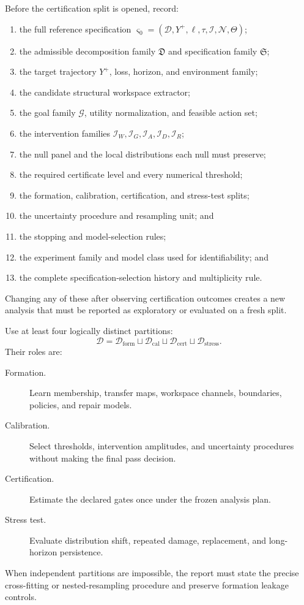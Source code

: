 Before the certification split is opened, record:
\begin{enumerate}
\item the full reference specification
 \(\varsigma_0=(\mathcal D,Y^+,\ell,\tau,\mathcal I,\mathcal N,\Theta)\);
\item the admissible decomposition family \(\mathfrak D\) and specification
 family \(\mathfrak S\);
\item the target trajectory \(Y^+\), loss, horizon, and environment family;
\item the candidate structural workspace extractor;
\item the goal family \(\mathcal G\), utility normalization, and feasible
 action set;
\item the intervention families \(\mathcal I_W,\mathcal I_G,\mathcal I_A,
 \mathcal I_D,\mathcal I_R\);
\item the null panel and the local distributions each null must preserve;
\item the required certificate level and every numerical threshold;
\item the formation, calibration, certification, and stress-test splits;
\item the uncertainty procedure and resampling unit; and
\item the stopping and model-selection rules;
\item the experiment family and model class used for identifiability; and
\item the complete specification-selection history and multiplicity rule.
\end{enumerate}
Changing any of these after observing certification outcomes creates a new
analysis that must be reported as exploratory or evaluated on a fresh split.


Use at least four logically distinct partitions:
\[
\boxed{
\mathcal D
=
\mathcal D_{\mathrm{form}}
\sqcup
\mathcal D_{\mathrm{cal}}
\sqcup
\mathcal D_{\mathrm{cert}}
\sqcup
\mathcal D_{\mathrm{stress}}.
}
\]
Their roles are:
\begin{description}
\item[Formation.] Learn membership, transfer maps, workspace channels,
 boundaries, policies, and repair models.
\item[Calibration.] Select thresholds, intervention amplitudes, and
 uncertainty procedures without making the final pass decision.
\item[Certification.] Estimate the declared gates once under the frozen
 analysis plan.
\item[Stress test.] Evaluate distribution shift, repeated damage, replacement,
 and long-horizon persistence.
\end{description}
When independent partitions are impossible, the report must state the precise
cross-fitting or nested-resampling procedure and preserve formation leakage
controls.

